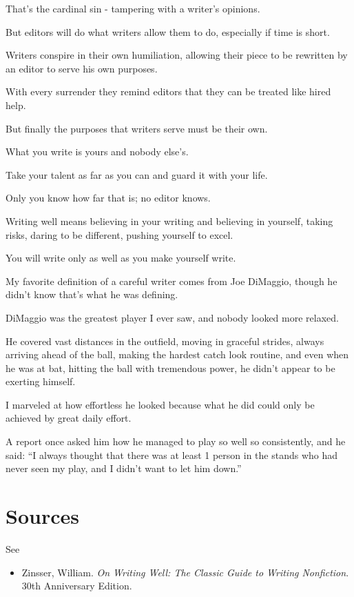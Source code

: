 \documentclass{book}
\numberwithin{equation}{section}
\begin{document}
That's the cardinal sin - tampering with a writer's opinions.

But editors will do what writers allow them to do, especially if time is short.

Writers conspire in their own humiliation, allowing their piece to be rewritten by an editor to serve his own purposes.

With every surrender they remind editors that they can be treated like hired help.

%
But finally the purposes that writers serve must be their own.

What you write is yours and nobody else's.

Take your talent as far as you can and guard it with your life.

Only you know how far that is; no editor knows.

Writing well means believing in your writing and believing in yourself, taking risks, daring to be different, pushing yourself to excel.

You will write only as well as you make yourself write.

%
My favorite definition of a careful writer comes from Joe DiMaggio, though he didn't know that's what he was defining.

DiMaggio was the greatest player I ever saw, and nobody looked more relaxed.

He covered vast distances in the outfield, moving in graceful strides, always arriving ahead of the ball, making the hardest catch look routine, and even when he was at bat, hitting the ball with tremendous power, he didn't appear to be exerting himself.

I marveled at how effortless he looked because what he did could only be achieved by great daily effort.

A report once asked him how he managed to play so well so consistently, and he said: ``I always thought that there was at least 1 person in the stands who had never seen my play, and I didn't want to let him down.''


\chapter{Sources}

See
\begin{itemize}
    \item Zinsser, William. \textit{On Writing Well: The Classic Guide to Writing Nonfiction}. 30th Anniversary Edition.
\end{itemize}
\end{document}
